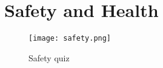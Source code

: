 \chapter{Safety and Health}
\begin{figure}[htp]
	\centering
	\texttt{[image: safety.png]}
	\caption{Safety quiz}
\end{figure}
